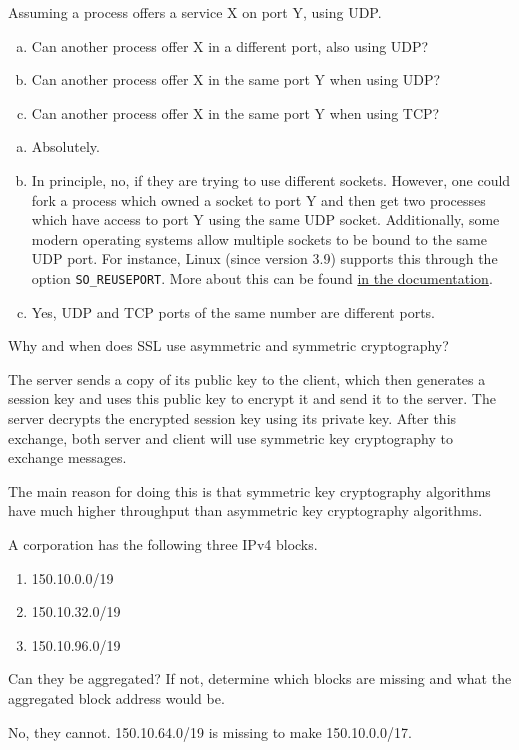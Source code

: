 \begin{Exercise}
Assuming a process offers a service X on port Y, using UDP.
\begin{enumerate}[a)]
\item Can another process offer X in a different port, also using UDP?
\item Can another process offer X in the same port Y when using UDP?
\item Can another process offer X in the same port Y when using TCP?
\end{enumerate}
\end{Exercise}
\begin{Answer}
\begin{enumerate}[a)]
\item Absolutely.
\item In principle, no, if they are trying to use different sockets.
However, one could fork a process which owned a socket to port Y and then get two processes which have access to port Y using the same UDP socket.
Additionally, some modern operating systems allow multiple sockets to be bound to the same UDP port. For instance, Linux (since version 3.9) supports this through the option \texttt{SO\_REUSEPORT}. More about this can be found \href{http://man7.org/linux/man-pages/man7/socket.7.html}{in the documentation}.
\item Yes, UDP and TCP ports of the same number are different ports.
\end{enumerate}
\end{Answer}

\begin{Exercise}
Why and when does SSL use asymmetric and symmetric cryptography?
\end{Exercise}
\begin{Answer}
The server sends a copy of its public key to the client, which then generates a session key and uses this public key to encrypt it and send it to the server.
The server decrypts the encrypted session key using its private key.
After this exchange, both server and client will use symmetric key cryptography to exchange messages.

The main reason for doing this is that symmetric key cryptography algorithms have much higher throughput than asymmetric key cryptography algorithms.
\end{Answer}

\begin{Exercise}
A corporation has the following three IPv4 blocks.
\begin{enumerate}
\item 150.10.0.0/19
\item 150.10.32.0/19
\item 150.10.96.0/19
\end{enumerate}
Can they be aggregated?
If not, determine which blocks are missing and what the aggregated block address would be.
\end{Exercise}
\begin{Answer}
No, they cannot. 150.10.64.0/19 is missing to make 150.10.0.0/17.
\end{Answer}

